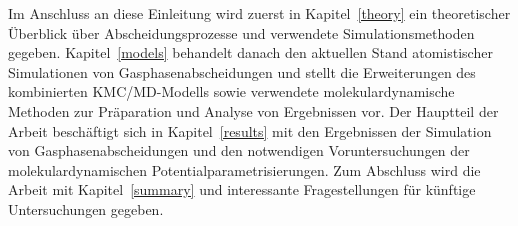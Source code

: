 Im Anschluss an diese Einleitung wird zuerst in Kapitel~\ref{theory} ein theoretischer Überblick über Abscheidungsprozesse und verwendete Simulationsmethoden gegeben.
Kapitel~\ref{models} behandelt danach den aktuellen Stand atomistischer Simulationen von Gasphasenabscheidungen und stellt die Erweiterungen des kombinierten KMC/MD-Modells sowie verwendete molekulardynamische Methoden zur Präparation und Analyse von Ergebnissen vor.
Der Hauptteil der Arbeit beschäftigt sich in Kapitel~\ref{results} mit den Ergebnissen der Simulation von Gasphasenabscheidungen und den notwendigen Voruntersuchungen der molekulardynamischen Potentialparametrisierungen.
Zum Abschluss wird die Arbeit mit Kapitel~\ref{summary} und interessante Fragestellungen für künftige Untersuchungen gegeben.
